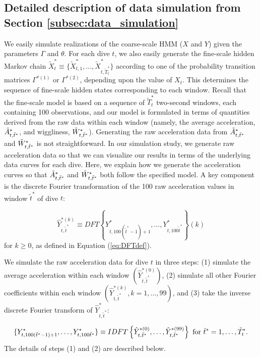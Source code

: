 \subsection{Detailed description of data simulation from Section \ref{subsec:data_simulation}}


\setcounter{equation}{6}   %

We easily simulate realizations of the coarse-scale HMM ($X$ and $Y$) given the parameters $\Gamma$ and $\theta$. For each dive $t$, we also easily generate the fine-scale hidden Markov chain $\tilde X^*_t \equiv \big\{\tilde X^*_{t,1},\ldots,\tilde X^*_{t,\tilde T_t^*}\big\}$ according to one of the probability transition matrices $\Gamma^{*(1)}$ or $\Gamma^{*(2)}$, depending upon the value of $X_t$. This determines the sequence of fine-scale hidden states corresponding to each window. Recall that the fine-scale model is based on a sequence of $\tilde T_t^*$ two-second windows, each containing 100 observations, and our model is formulated in terms of quantities derived from the raw data within each window (namely, the average acceleration, $\tilde{A}^*_{t,\tilde t^*}$, and wiggliness, $\tilde{W}^*_{ t,\tilde t^*}$). Generating the raw acceleration data from $\tilde{A}^*_{t,\tilde t^*}$ and $\tilde{W}^*_{ t,\tilde t^*}$ is not straightforward. In our simulation study, we generate raw acceleration data so that we can visualize our results in terms of the underlying data curves for each dive. Here, we explain how we generate the acceleration curves so that $\tilde{A}^*_{t,\tilde t^*}$ and $\tilde{W}^*_{ t,\tilde t^*}$ both follow the specified model. A key component is the discrete Fourier transformation of the 100 raw acceleration values in window $\tilde{t}^*$ of dive $t$:

\[
    \hat{Y}^{*(k)}_{t,\tilde{t}^*}  \equiv DFT\left\{Y^*_{t,100 (\tilde{t}^*-1) + 1 },\ldots, Y^*_{t,100 \tilde{t}^*}\right\}(k)
\]
for $k \geq 0$, as defined in Equation (\ref{eq:DFTdef}).

We simulate the raw acceleration data for dive $t$ in three steps: (1) simulate the average acceleration within each window $\left(\hat Y^{*(0)}_{t,\tilde t^*}\right)$, (2) simulate all other Fourier coefficients within each window $\left(\hat Y^{*(k)}_{t,\tilde t^*}, k = 1,\ldots,99\right)$, and (3) take the inverse discrete Fourier transform of $\hat{Y}^*_{t,\tilde t^*}$:

\[
    \{Y^*_{t,100(\tilde t^* - 1) + 1},\ldots,Y^*_{t,100\tilde t^*}\} \equiv IDFT\left\{\hat{Y}^{*(0)}_{t,\tilde t^*},
    \ldots, \hat{Y}^{*(99)}_{t,\tilde t^*}\right\}
    {\rm{~for~}} \tilde t^* = 1,\ldots,\tilde T^*_t.
\]
The details of steps (1) and (2) are described below.

